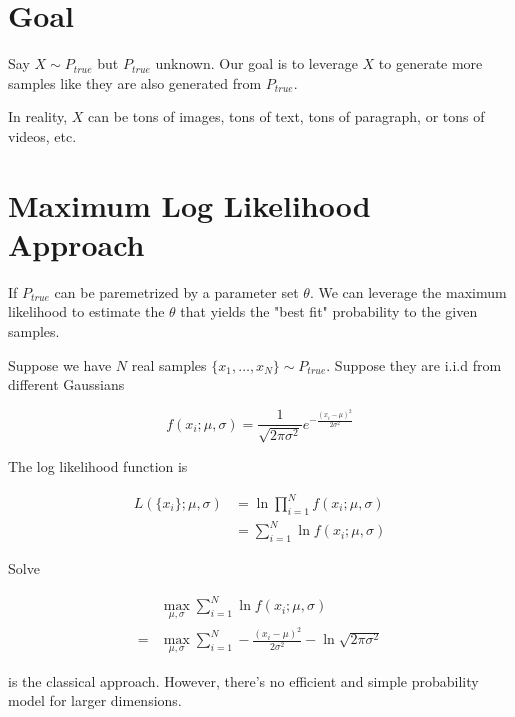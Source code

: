 \documentclass{article}
\begin{document}
    \section*{Goal}

        Say $ X \sim P_{true} $ but $ P_{true} $ unknown. Our goal is to
        leverage $ X $ to generate more samples like they are also generated
        from $ P_{true} $.
        
        In reality, $ X $ can be tons of images, tons of text, tons of paragraph,
        or tons of videos, etc.

    \section*{Maximum Log Likelihood Approach}

        If $ P_{true} $ can be paremetrized by a parameter set $ \theta $.
        We can leverage the maximum likelihood to estimate the $ \theta $ that
        yields the "best fit" probability to the given samples.

        Suppose we have $ N $ real samples $ \{ x_{1}, \dots, x_{N} \} \sim P_{true} $.
        Suppose they are i.i.d from different Gaussians

        \begin{equation*}
            f( x_{i}; \mu, \sigma ) = \frac{1}{\sqrt{2 \pi \sigma^2}} e^{-\frac{(x_{i} - \mu)^2}{2 \sigma^2}}
        \end{equation*}

        The log likelihood function is

        \begin{align*}
             L( \{ x_{i} \}; \mu, \sigma ) &= \ln \prod_{i=1}^N f( x_{i}; \mu, \sigma ) \\
                             &= \sum_{i = 1}^N \ln f( x_{i}; \mu, \sigma )
        \end{align*}

        Solve

        \begin{align*}
              & \max_{\mu, \sigma} \sum_{i = 1}^N \ln f( x_{i}; \mu, \sigma ) \\
            = & \max_{\mu, \sigma} \sum_{i = 1}^N -\frac{( x_{i} - \mu ) ^ 2}{2
            \sigma^2} - \ln \sqrt{2 \pi \sigma^2 }
        \end{align*}

        is the classical approach. However, there's no efficient
        and simple probability model for larger dimensions.
\end{document}
